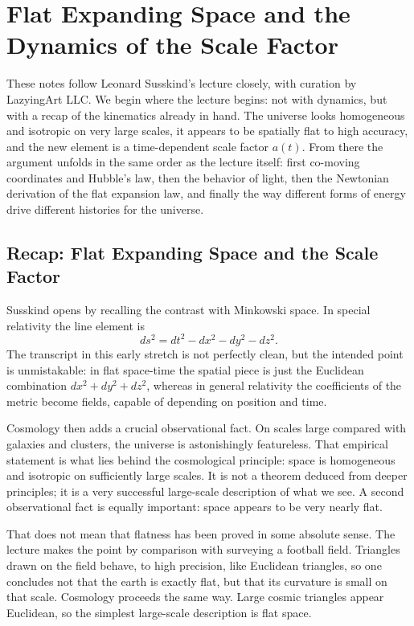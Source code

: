 \chapter{Flat Expanding Space and the Dynamics of the Scale Factor}

These notes follow Leonard Susskind's lecture closely, with curation by LazyingArt LLC. We begin where the lecture begins: not with dynamics, but with a recap of the kinematics already in hand. The universe looks homogeneous and isotropic on very large scales, it appears to be spatially flat to high accuracy, and the new element is a time-dependent scale factor \(a(t)\). From there the argument unfolds in the same order as the lecture itself: first co-moving coordinates and Hubble's law, then the behavior of light, then the Newtonian derivation of the flat expansion law, and finally the way different forms of energy drive different histories for the universe.

\section{Recap: Flat Expanding Space and the Scale Factor}

Susskind opens by recalling the contrast with Minkowski space. In special relativity the line element is
\begin{equation}
ds^2 = dt^2 - dx^2 - dy^2 - dz^2.
\end{equation}
The transcript in this early stretch is not perfectly clean, but the intended point is unmistakable: in flat space-time the spatial piece is just the Euclidean combination \(dx^2+dy^2+dz^2\), whereas in general relativity the coefficients of the metric become fields, capable of depending on position and time.

Cosmology then adds a crucial observational fact. On scales large compared with galaxies and clusters, the universe is astonishingly featureless. That empirical statement is what lies behind the cosmological principle: space is homogeneous and isotropic on sufficiently large scales. It is not a theorem deduced from deeper principles; it is a very successful large-scale description of what we see. A second observational fact is equally important: space appears to be very nearly flat.

That does not mean that flatness has been proved in some absolute sense. The lecture makes the point by comparison with surveying a football field. Triangles drawn on the field behave, to high precision, like Euclidean triangles, so one concludes not that the earth is exactly flat, but that its curvature is small on that scale. Cosmology proceeds the same way. Large cosmic triangles appear Euclidean, so the simplest large-scale description is flat space.

